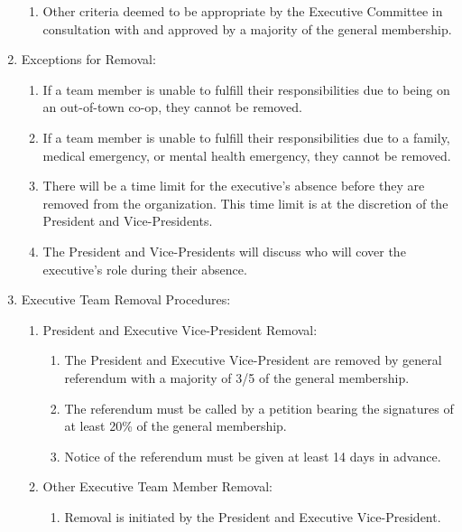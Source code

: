 \documentclass[12pt,a4paper]{article}
\begin{document}
\begin{enumerate}
\begin{enumerate}
\item Other criteria deemed to be appropriate by the Executive Committee in consultation with and approved by a majority of the general membership.
\end{enumerate}

\item Exceptions for Removal:

\begin{enumerate}
\item If a team member is unable to fulfill their responsibilities due to being on an out-of-town co-op, they cannot be removed.

\item If a team member is unable to fulfill their responsibilities due to a family, medical emergency, or mental health emergency, they cannot be removed.

\item There will be a time limit for the executive's absence before they are removed from the organization. This time limit is at the discretion of the President and Vice-Presidents.

\item The President and Vice-Presidents will discuss who will cover the executive's role during their absence.
\end{enumerate}

\item Executive Team Removal Procedures:

\begin{enumerate}
\item President and Executive Vice-President Removal:

\begin{enumerate}
\item The President and Executive Vice-President are removed by general referendum with a majority of 3/5 of the general membership.

\item The referendum must be called by a petition bearing the signatures of at least 20\% of the general membership.

\item Notice of the referendum must be given at least 14 days in advance.
\end{enumerate}

\item Other Executive Team Member Removal:

\begin{enumerate}
\item Removal is initiated by the President and Executive Vice-President.


\end{enumerate}
\end{enumerate}
\end{enumerate}
\end{document}
